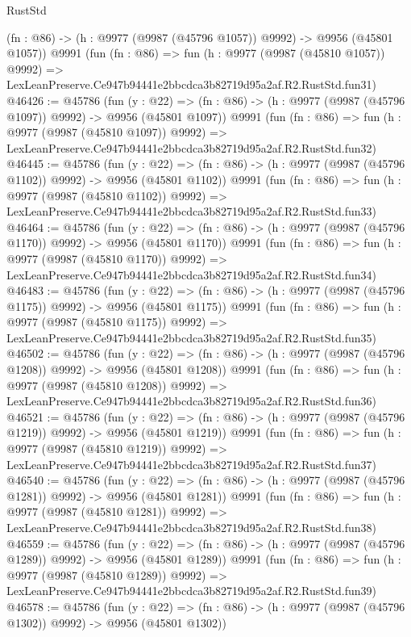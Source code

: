 \begin{lexlean}{RustStd}
\begin{coremodule}
    (fn : @86) -> (h : @9977 (@9987 (@45796 @1057)) @9992) -> @9956 (@45801 @1057))
    @9991
    (fun (fn : @86) =>
    fun (h : @9977 (@9987 (@45810 @1057)) @9992) =>
    LexLeanPreserve.Ce947b94441e2bbcdca3b82719d95a2af.R2.RustStd.fun31)
@46426 := @45786
    (fun (y : @22) =>
    (fn : @86) -> (h : @9977 (@9987 (@45796 @1097)) @9992) -> @9956 (@45801 @1097))
    @9991
    (fun (fn : @86) =>
    fun (h : @9977 (@9987 (@45810 @1097)) @9992) =>
    LexLeanPreserve.Ce947b94441e2bbcdca3b82719d95a2af.R2.RustStd.fun32)
@46445 := @45786
    (fun (y : @22) =>
    (fn : @86) -> (h : @9977 (@9987 (@45796 @1102)) @9992) -> @9956 (@45801 @1102))
    @9991
    (fun (fn : @86) =>
    fun (h : @9977 (@9987 (@45810 @1102)) @9992) =>
    LexLeanPreserve.Ce947b94441e2bbcdca3b82719d95a2af.R2.RustStd.fun33)
@46464 := @45786
    (fun (y : @22) =>
    (fn : @86) -> (h : @9977 (@9987 (@45796 @1170)) @9992) -> @9956 (@45801 @1170))
    @9991
    (fun (fn : @86) =>
    fun (h : @9977 (@9987 (@45810 @1170)) @9992) =>
    LexLeanPreserve.Ce947b94441e2bbcdca3b82719d95a2af.R2.RustStd.fun34)
@46483 := @45786
    (fun (y : @22) =>
    (fn : @86) -> (h : @9977 (@9987 (@45796 @1175)) @9992) -> @9956 (@45801 @1175))
    @9991
    (fun (fn : @86) =>
    fun (h : @9977 (@9987 (@45810 @1175)) @9992) =>
    LexLeanPreserve.Ce947b94441e2bbcdca3b82719d95a2af.R2.RustStd.fun35)
@46502 := @45786
    (fun (y : @22) =>
    (fn : @86) -> (h : @9977 (@9987 (@45796 @1208)) @9992) -> @9956 (@45801 @1208))
    @9991
    (fun (fn : @86) =>
    fun (h : @9977 (@9987 (@45810 @1208)) @9992) =>
    LexLeanPreserve.Ce947b94441e2bbcdca3b82719d95a2af.R2.RustStd.fun36)
@46521 := @45786
    (fun (y : @22) =>
    (fn : @86) -> (h : @9977 (@9987 (@45796 @1219)) @9992) -> @9956 (@45801 @1219))
    @9991
    (fun (fn : @86) =>
    fun (h : @9977 (@9987 (@45810 @1219)) @9992) =>
    LexLeanPreserve.Ce947b94441e2bbcdca3b82719d95a2af.R2.RustStd.fun37)
@46540 := @45786
    (fun (y : @22) =>
    (fn : @86) -> (h : @9977 (@9987 (@45796 @1281)) @9992) -> @9956 (@45801 @1281))
    @9991
    (fun (fn : @86) =>
    fun (h : @9977 (@9987 (@45810 @1281)) @9992) =>
    LexLeanPreserve.Ce947b94441e2bbcdca3b82719d95a2af.R2.RustStd.fun38)
@46559 := @45786
    (fun (y : @22) =>
    (fn : @86) -> (h : @9977 (@9987 (@45796 @1289)) @9992) -> @9956 (@45801 @1289))
    @9991
    (fun (fn : @86) =>
    fun (h : @9977 (@9987 (@45810 @1289)) @9992) =>
    LexLeanPreserve.Ce947b94441e2bbcdca3b82719d95a2af.R2.RustStd.fun39)
@46578 := @45786
    (fun (y : @22) =>
    (fn : @86) -> (h : @9977 (@9987 (@45796 @1302)) @9992) -> @9956 (@45801 @1302))

\end{coremodule}
\end{lexlean}
